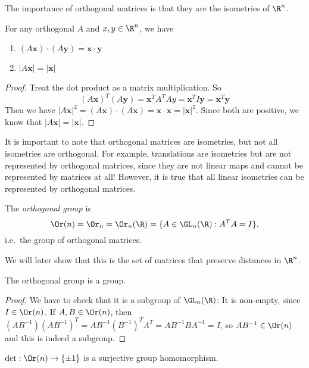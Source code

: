 \documentclass[a4paper]{article}
\begin{document}
The importance of orthogonal matrices is that they are the isometries of $\R^n$.
\begin{lemma} For any orthogonal $A$ and $x, y\in \R^n$, we have
  \begin{enumerate}
    \item $(A\mathbf{x})\cdot (A\mathbf{y}) = \mathbf{x\cdot y}$
    \item $|A\mathbf{x}| = |\mathbf{x}|$
  \end{enumerate}
\end{lemma}

\begin{proof}
  Treat the dot product as a matrix multiplication. So
  \[
    (A\mathbf{x})^T(A\mathbf{y}) = \mathbf{x}^{T}A^TAy = \mathbf{x}^TI\mathbf{y} = \mathbf{x}^T\mathbf{y}
  \]
  Then we have $|A\mathbf{x}|^2 = (A\mathbf{x})\cdot (A\mathbf{x}) = \mathbf{x}\cdot \mathbf{x} = |\mathbf{x}|^2$. Since both are positive, we know that $|A\mathbf{x}| = |\mathbf{x}|$.
\end{proof}
It is important to note that orthogonal matrices are isometries, but not all isometries are orthogonal. For example, translations are isometries but are not represented by orthogonal matrices, since they are not linear maps and cannot be represented by matrices at all! However, it is true that all linear isometries can be represented by orthogonal matrices.

\begin{defi}
  The \emph{orthogonal group} is
  \[
    \Or(n) = \Or_n = \Or_n(\R) = \{A\in \GL_n(\R): A^TA = I\},
  \]
  i.e.\ the group of orthogonal matrices.
\end{defi}
We will later show that this is the set of matrices that preserve distances in $\R^n$.

\begin{lemma}
  The orthogonal group is a group.
\end{lemma}

\begin{proof}
  We have to check that it is a subgroup of $\GL_n(\R)$: It is non-empty, since $I\in \Or(n)$. If $A, B\in \Or(n)$, then $(AB^{-1})(AB^{-1})^T = AB^{-1}(B^{-1})^TA^{T} = AB^{-1}BA^{-1} = I$, so $AB^{-1}\in \Or(n)$ and this is indeed a subgroup.
\end{proof}


\begin{prop}
  $\det: \Or(n) \to \{\pm 1\}$ is a surjective group homomorphism.
\end{prop}
\end{document}
